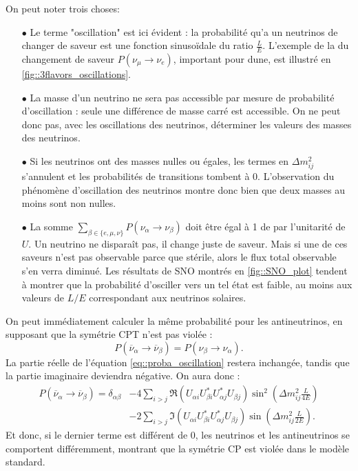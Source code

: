             On peut noter trois choses:
            \begin{itemize}
                \item[$\bullet$] Le terme "oscillation" est ici évident : la probabilité qu'a un neutrinos de changer de saveur est une fonction sinusoïdale du ratio $\frac{L}{E}$. L'exemple de la du changement de saveur $P(\nu_{\mu}\to\nu_e)$, important pour \gls{dune}, est illustré en \autoref{fig::3flavors_oscillations}.
                \item[$\bullet$] La masse d'un neutrino ne sera pas accessible par mesure de probabilité d'oscillation : seule une différence de masse carré est accessible. On ne peut donc pas, avec les oscillations des neutrinos, déterminer les valeurs des masses des neutrinos.
                \item[$\bullet$] Si les neutrinos ont des masses nulles ou égales, les termes en $\Delta m_{ij}^2$ s'annulent et les probabilités de transitions tombent à 0. L'observation du phénomène d'oscillation des neutrinos montre donc bien que deux masses au moins sont non nulles.
                \item[$\bullet$] La somme $\sum_{\beta\in\{e,\mu,\nu\}}P(\nu_{\alpha}\to\nu_{\beta})$ doit être égal à 1 de par l'unitarité de $U$. Un neutrino ne disparaît pas, il change juste de saveur. Mais si une de ces saveurs n'est pas observable parce que stérile, alors le flux total observable s'en verra diminué. Les résultats de SNO montrés en \autoref{fig::SNO_plot} tendent à montrer que la probabilité d'osciller vers un tel état est faible, au moins aux valeurs de $L/E$ correspondant aux neutrinos solaires.
            \end{itemize}
            
            On peut immédiatement calculer la même probabilité pour les antineutrinos, en supposant que la symétrie CPT n'est pas violée : 
            \begin{equation}
                P(\overline{\nu}_{\alpha}\to\overline{\nu}_{\beta}) = P(\nu_{\beta}\to\nu_{\alpha}).
            \end{equation}
            La partie réelle de l'équation \eqref{eq::proba_oscillation} restera inchangée, tandis que la partie imaginaire deviendra négative. On aura donc :
            \begin{equation}
                \begin{split}
                    P(\overline{\nu}_{\alpha}\to\overline{\nu}_{\beta}) = \delta_{\alpha\beta} & - 4\sum_{i>j}\Re(U_{\alpha i}U_{\beta i}^*U_{\alpha j}^*U_{\beta j})\sin^2\left(\Delta m_{ij}^2\frac{L}{4E}\right) \\
                    & -2\sum_{i>j}\Im(U_{\alpha i}U_{\beta i}^*U_{\alpha j}^*U_{\beta j})\sin\left(\Delta m_{ij}^2\frac{L}{2E}\right).
                \end{split}
            \end{equation}
            Et donc, si le dernier terme est différent de 0, les neutrinos et les antineutrinos se comportent différemment, montrant que la symétrie CP est violée dans le modèle standard.
            
